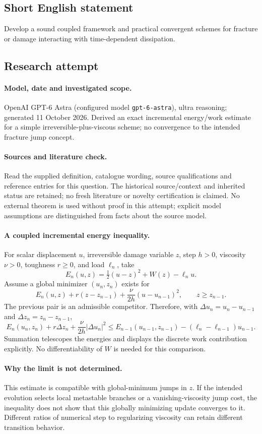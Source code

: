 \documentclass[11pt]{article}
\begin{document}
\subsection{Short English statement}
Develop a sound coupled framework and practical convergent schemes for fracture or damage interacting with time-dependent dissipation.
\subsection{Research attempt}
\paragraph{Model, date and investigated scope.}
OpenAI GPT-6 Astra (configured model \texttt{gpt-6-astra}), ultra reasoning; generated 11 October 2026. Derived an exact incremental energy/work estimate for a simple irreversible-plus-viscous scheme; no convergence to the intended fracture jump concept.

\paragraph{Sources and literature check.}
Read the supplied definition, catalogue wording, source qualifications and reference entries for this question. The historical source/context and inherited status are retained; no fresh literature or novelty certification is claimed. No external theorem is used without proof in this attempt; explicit model assumptions are distinguished from facts about the source model.

\paragraph{A coupled incremental energy inequality.} For scalar displacement \(u\), irreversible damage variable \(z\), step \(h>0\), viscosity \(\nu>0\), toughness \(r\ge0\), and load \(\ell_n\), take
\[
 E_n(u,z)=\tfrac12(u-z)^2+W(z)-\ell_nu.
\]
Assume a global minimizer \((u_n,z_n)\) exists for
\[
 E_n(u,z)+r(z-z_{n-1})+\frac{\nu}{2h}(u-u_{n-1})^2,
 \qquad z\ge z_{n-1}.
\]
The previous pair is an admissible competitor. Therefore, with \(\Delta u_n=u_n-u_{n-1}\) and \(\Delta z_n=z_n-z_{n-1}\),
\[
 E_n(u_n,z_n)+r\Delta z_n+\frac\nu{2h}|\Delta u_n|^2
 \le E_{n-1}(u_{n-1},z_{n-1})-(\ell_n-\ell_{n-1})u_{n-1}.
\]
Summation telescopes the energies and displays the discrete work contribution explicitly. No differentiability of \(W\) is needed for this comparison.
\paragraph{Why the limit is not determined.} This estimate is compatible with global-minimum jumps in \(z\). If the intended evolution selects local metastable branches or a vanishing-viscosity jump cost, the inequality does not show that this globally minimizing update converges to it. Different ratios of numerical step to regularizing viscosity can retain different transition behavior.
\end{document}
